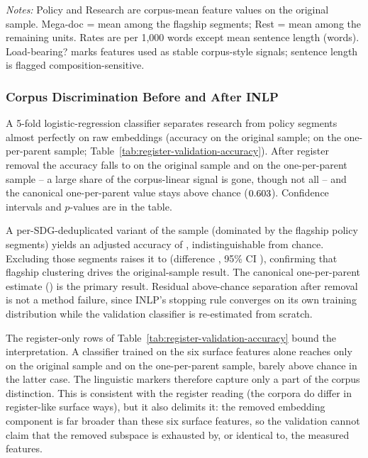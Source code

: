 \documentclass[12pt,a4paper]{article}
\begin{document}
\begin{table}[ht]
\centering
\small
\caption{Corpus register-feature contrasts (original sample).}
\label{tab:register-feature-contrasts}
\resizebox{\textwidth}{!}{}
\par\smallskip\footnotesize\emph{Notes:} Policy and Research are corpus-mean feature values on the original sample. Mega-doc = mean among the \RegValMultiParentUnits{} flagship segments; Rest = mean among the remaining units. Rates are per 1{,}000 words except mean sentence length (words). Load-bearing? marks features used as stable corpus-style signals; sentence length is flagged composition-sensitive.\par
\end{table}

\subsubsection{Corpus Discrimination Before and After INLP}
\label{sec:regval-discrimination}

A 5-fold logistic-regression classifier separates research from policy segments almost perfectly on raw embeddings (accuracy \RegValAccRawOrig{} on the original sample; \RegValAccRawOpp{} on the one-per-parent sample; Table~\ref{tab:register-validation-accuracy}). After register removal the accuracy falls to \RegValAccAdjOrig{} on the original sample and \RegValAccAdjOpp{} on the one-per-parent sample -- a large share of the corpus-linear signal is gone, though not all -- and the canonical one-per-parent value stays above chance ($0.603{}$). Confidence intervals and $p$-values are in the table.

A per-SDG-deduplicated variant of the sample (dominated by the \RegValMultiParentUnits{} flagship policy segments) yields an adjusted accuracy of \RegValAccAdjOrig{}, indistinguishable from chance. Excluding those segments raises it to \RegValAccMegaExcl{} (difference \RegValAccRise{}, 95\% CI \RegValAccRiseCi{}), confirming that flagship clustering drives the original-sample result. The canonical one-per-parent estimate (\RegValAccAdjOpp{}) is the primary result. Residual above-chance separation after removal is not a method failure, since INLP's stopping rule converges on its own training distribution while the validation classifier is re-estimated from scratch.

The register-only rows of Table~\ref{tab:register-validation-accuracy} bound the interpretation. A classifier trained on the six surface features alone reaches only \RegValAccRegOrig{} on the original sample and \RegValAccRegOpp{} on the one-per-parent sample, barely above chance in the latter case. The linguistic markers therefore capture only a part of the corpus distinction. This is consistent with the register reading (the corpora do differ in register-like surface ways), but it also delimits it: the removed embedding component is far broader than these six surface features, so the validation cannot claim that the removed subspace is exhausted by, or identical to, the measured features.
\end{document}
